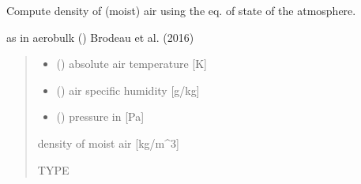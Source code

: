 \documentclass[letterpaper,10pt,english]{sphinxmanual}
\begin{document}

\begin{fulllineitems}
\label{\detokenize{users_guide:AirSeaFluxCode.util_subs.rho_air}}
\pysigstartsignatures
\pysiglinewithargsret
{}
{\sphinxparamcomma {}\sphinxparamcomma {}}
{}
\pysigstopsignatures
\sphinxAtStartPar
Compute density of (moist) air using the eq. of state of the atmosphere.

\sphinxAtStartPar
as in aerobulk () Brodeau et al. (2016)
\begin{quote}\begin{description}
\begin{itemize}
\item {}
\sphinxAtStartPar
{} () \textendash{} absolute air temperature             {[}K{]}

\item {}
\sphinxAtStartPar
{} () \textendash{} air specific humidity   {[}g/kg{]}

\item {}
\sphinxAtStartPar
{} () \textendash{} pressure in                {[}Pa{]}

\end{itemize}

\sphinxAtStartPar
{} \textendash{} density of moist air   {[}kg/m\textasciicircum{}3{]}

\sphinxAtStartPar
TYPE

\end{description}\end{quote}

\end{fulllineitems}

\end{document}
